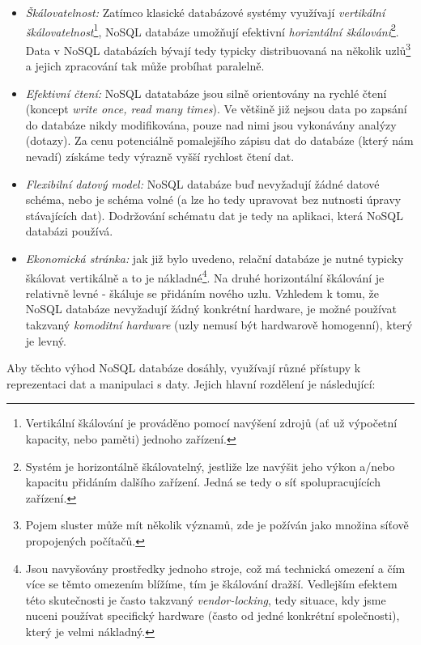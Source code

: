 \begin{itemize}
  \item{\textit{Škálovatelnost:}} Zatímco klasické databázové systémy využívají \textit{vertikální škálovatelnost}\footnote{Vertikální škálování je prováděno pomocí navýšení zdrojů (ať už výpočetní kapacity, nebo paměti) jednoho zařízení.}, NoSQL databáze umožňují efektivní \textit{horizntální škálování}\footnote{Systém je horizontálně škálovatelný, jestliže lze navýšit jeho výkon a/nebo kapacitu přidáním dalšího zařízení. Jedná se tedy o síť spolupracujících zařízení.}. Data v NoSQL databázích bývají tedy typicky distribuovaná na několik uzlů\footnote{Pojem sluster může mít několik významů, zde je požíván jako množina síťově propojených počítačů.} a jejich zpracování tak může probíhat paralelně. 
  \item{\textit{Efektivní čtení:}} NoSQL datatabáze jsou silně orientovány na rychlé čtení (koncept \textit{write once, read many times}). Ve většině již nejsou data po zapsání do databáze nikdy modifikována, pouze nad nimi jsou vykonávány analýzy (dotazy). Za cenu potenciálně pomalejšího zápisu dat do databáze (který nám nevadí) získáme tedy výrazně vyšší rychlost čtení dat.  
  \item{\textit{Flexibilní datový model:}} NoSQL databáze buď nevyžadují žádné datové schéma, nebo je schéma volné (a lze ho tedy upravovat bez nutnosti úpravy stávajících dat). Dodržování schématu dat je tedy na aplikaci, která NoSQL databázi používá.  
  \item{\textit{Ekonomická stránka:}} jak již bylo uvedeno, relační databáze je nutné typicky škálovat vertikálně a to je nákladné\footnote{Jsou navyšovány prostředky jednoho stroje, což má technická omezení a čím více se těmto omezením blížíme, tím je škálování dražší. Vedlejším efektem této skutečnosti je často takzvaný \textit{vendor-locking}, tedy situace, kdy jsme nuceni používat specifický hardware (často od jedné konkrétní společnosti), který je velmi nákladný.}. Na druhé horizontální škálování je relativně levné - škáluje se přidáním nového uzlu. Vzhledem k tomu, že NoSQL databáze nevyžadují žádný konkrétní hardware, je možné používat takzvaný \textit{komoditní hardware} (uzly nemusí být hardwarově homogenní), který je levný.  
\end{itemize}

Aby těchto výhod NoSQL databáze dosáhly, využívají různé přístupy k reprezentaci dat a manipulaci s daty. Jejich hlavní rozdělení je následující: 

